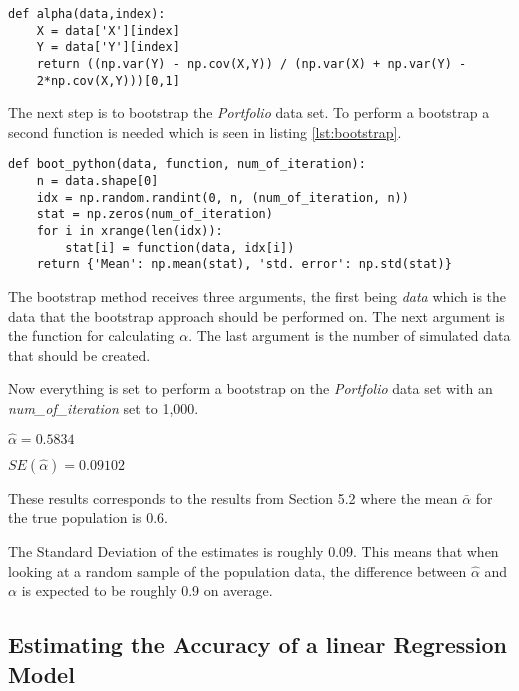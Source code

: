\begin{lstlisting}[caption={Function for calculating $\alpha$ in python}, label=lst:alpha, mathescape=true]
def alpha(data,index):
	X = data['X'][index]
	Y = data['Y'][index]
	return ((np.var(Y) - np.cov(X,Y)) / (np.var(X) + np.var(Y) - 
	2*np.cov(X,Y)))[0,1]
\end{lstlisting}

The next step is to bootstrap the \emph{Portfolio} data set.
To perform a bootstrap a second function is needed which is seen in listing \ref{lst:bootstrap}.

\begin{lstlisting}[caption={Bootstrap function in python}, label=lst:bootstrap, mathescape=true]
def boot_python(data, function, num_of_iteration):
	n = data.shape[0]
	idx = np.random.randint(0, n, (num_of_iteration, n))
	stat = np.zeros(num_of_iteration)
	for i in xrange(len(idx)):
		stat[i] = function(data, idx[i])
	return {'Mean': np.mean(stat), 'std. error': np.std(stat)}
\end{lstlisting}

The bootstrap method receives three arguments, the first being \emph{data} which is the data that the bootstrap approach should be performed on. The next argument is the function for calculating $\alpha$. The last argument is the number of simulated data that should be created.  

Now everything is set to perform a bootstrap on the \emph{Portfolio} data set with an \emph{num\_of\_iteration} set to 1,000.

\begin{center}
	$\hat{\alpha} = 0.5834$
\end{center}

\begin{center}
	$SE(\hat{\alpha}) = 0.09102$
\end{center}

These results corresponds to the results from Section 5.2\citep{ISLR} where the mean $\bar{\alpha}$ for the true population is 0.6. 

The Standard Deviation of the estimates is roughly 0.09. This means that when looking at a random sample of the population data, the difference between $\hat{\alpha}$ and $\alpha$ is expected to be roughly 0.9 on average.


\subsection{Estimating the Accuracy of a linear Regression Model}


